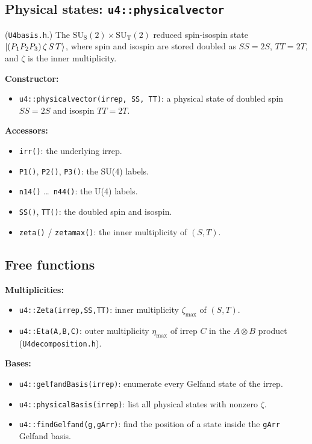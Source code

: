 \documentclass[aps,onecolumn,10pt,superscriptaddress,floatfix,nofootinbib]{revtex4}
\begin{document}
\subsection{Physical states: \texttt{u4::physicalvector}}
(\verb|U4basis.h|.) The $\mathrm{SU_S(2)}\times\mathrm{SU_T(2)}$ reduced spin-isospin
state $\ket{(P_1 P_2 P_3)\,\zeta\,S\,T}$, where spin and isospin are stored
doubled as $SS=2S$, $TT=2T$, and $\zeta$ is the inner multiplicity.

\textbf{Constructor:}
\begin{itemize}
    \item \verb|u4::physicalvector(irrep, SS, TT)|: a physical state of doubled spin $SS=2S$ and isospin $TT=2T$.
\end{itemize}

\textbf{Accessors:}
\begin{itemize}
    \item \verb|irr()|: the underlying irrep.
    \item \verb|P1()|, \verb|P2()|, \verb|P3()|: the SU(4) labels.
    \item \verb|n14()| \dots\ \verb|n44()|: the U(4) labels.
    \item \verb|SS()|, \verb|TT()|: the doubled spin and isospin.
    \item \verb|zeta()| / \verb|zetamax()|: the inner multiplicity of $(S,T)$.
\end{itemize}

\subsection{Free functions}
\textbf{Multiplicities:}
\begin{itemize}
    \item \verb|u4::Zeta(irrep,SS,TT)|: inner multiplicity $\zeta_{\max}$ of $(S,T)$.%
    \item \verb|u4::Eta(A,B,C)|: outer multiplicity $\eta_{\max}$ of irrep $C$ in the $A\otimes B$ product (\verb|U4decomposition.h|).
\end{itemize}

\textbf{Bases:}
\begin{itemize}
    \item \verb|u4::gelfandBasis(irrep)|: enumerate every Gelfand state of the irrep.
    \item \verb|u4::physicalBasis(irrep)|: list all physical states with nonzero $\zeta$.
    \item \verb|u4::findGelfand(g,gArr)|: find the position of a state inside the \verb|gArr| Gelfand basis.
\end{itemize}
\end{document}
